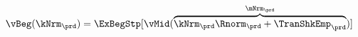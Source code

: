   \begin{equation}\begin{gathered}\begin{aligned}
        \vBeg(\kNrm_{\prd}) & = \ExBegStp[\vMid(\overbrace{\kNrm_{\prd} \Rnorm_{\prd} + \TranShkEmp_{\prd}}^{\mNrm_{\prd}})]  \label{eq:vBeg}
      \end{aligned}\end{gathered}\end{equation}
